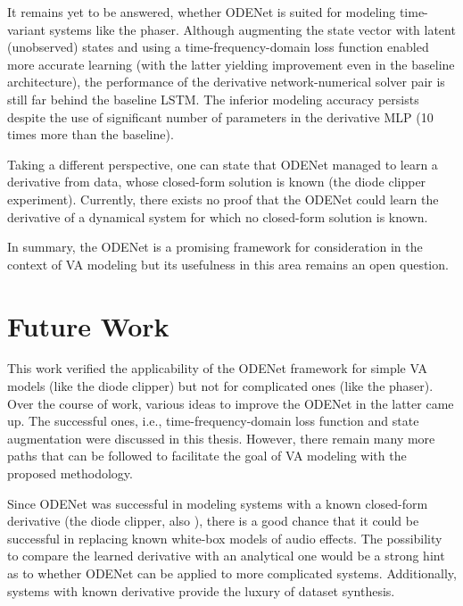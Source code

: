 It remains yet to be answered, whether ODENet is suited for modeling time-variant systems like the phaser. Although augmenting the state vector with latent (unobserved) states and using a time-frequency-domain loss function enabled more accurate learning (with the latter yielding improvement even in the baseline architecture), the performance of the derivative network-numerical solver pair is still far behind the baseline \ac{LSTM}. The inferior modeling accuracy persists despite the use of significant number of parameters in the derivative \ac{MLP} (10 times more than the baseline).

Taking a different perspective, one can state that ODENet managed to learn a derivative from data, whose closed-form solution is known (the diode clipper experiment). Currently, there exists no proof that the ODENet could learn the derivative of a dynamical system for which no closed-form solution is known.

In summary, the ODENet is a promising framework for consideration in the context of \ac{VA} modeling but its usefulness in this area remains an open question.

\section{Future Work}
\label{sec:future_work}

This work verified the applicability of the ODENet framework for simple \ac{VA} models (like the diode clipper) but not for complicated ones (like the phaser). Over the course of work, various ideas to improve the ODENet in the latter came up. The successful ones, i.e., time-frequency-domain loss function and state augmentation were discussed in this thesis. However, there remain many more paths that can be followed to facilitate the goal of \ac{VA} modeling with the proposed methodology.

Since ODENet was successful in modeling systems with a known closed-form derivative (the diode clipper, also \cite{Chen2018,Karlsson2019}), there is a good chance that it could be successful in replacing known white-box models of audio effects. The possibility to compare the learned derivative with an analytical one would be a strong hint as to whether ODENet can be applied to more complicated systems. Additionally, systems with known derivative provide the luxury of dataset synthesis.

